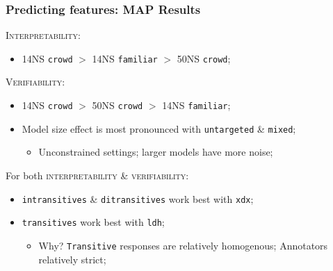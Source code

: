 \documentclass[xcolor={dvipsnames}]{beamer}
\newcommand{\feat}[1]{\textsc{#1}}
\newcommand{\param}[1]{\texttt{#1}}
\begin{document}
\begin{frame}
\frametitle{Predicting features: MAP Results}
\vspace{-.5em}
\pause
\feat{Interpretability}:
\begin{itemize}
\pause
\item 14NS \param{crowd} $>$ 14NS \param{familiar} $>$ 50NS \param{crowd};
\end{itemize}

\vspace{1em}

\pause
\feat{Verifiability}:
\begin{itemize}
\pause
\item 14NS \param{crowd} $>$ 50NS \param{crowd} $>$ 14NS \param{familiar};
\pause
\item Model size effect is most pronounced with \param{untargeted} \& \param{mixed};
\begin{itemize}
\pause
\item Unconstrained settings; larger models have more noise;
\end{itemize}
\end{itemize}

\vspace{1em}

\pause
For both \feat{interpretability} \& \feat{verifiability}:
\begin{itemize}
\pause
\item \param{intransitives} \& \param{ditransitives} work best with \param{xdx};
\pause
\item \param{transitives} work best with \param{ldh};
\begin{itemize}
\pause
\item Why? \param{Transitive} responses are relatively homogenous; Annotators relatively strict;
\end{itemize}
\end{itemize}
\end{frame}
\end{document}
